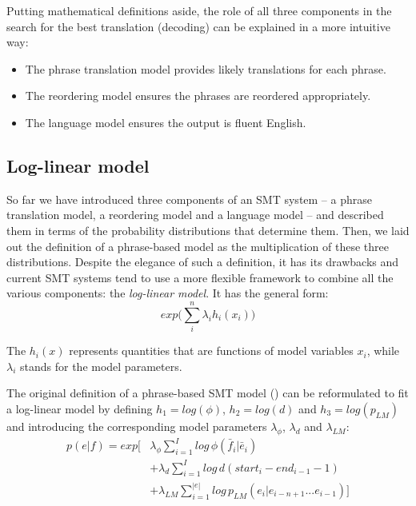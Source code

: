 Putting mathematical definitions aside, the role of all three components in the search for
the best translation (decoding) can be explained in a more intuitive way:
\begin{itemize}
  \item The phrase translation model provides likely translations for each phrase.
  \item The reordering model ensures the phrases are reordered appropriately.
  \item The language model ensures the output is fluent English.
\end{itemize}

\subsection{Log-linear model}

So far we have introduced three components of an SMT system -- a phrase translation model,
a reordering model and a language model -- and described them in terms of the probability
distributions that determine them.
Then, we laid out the definition of a phrase-based model as the multiplication of these
three distributions.
Despite the elegance of such a definition, it has its drawbacks and current SMT
systems tend to use a more flexible framework to combine all the various
components: the \emph{log-linear model}.
It has the general form:
\begin{equation}
  exp \Big( \sum_i^n \lambda_i h_i(x_i) \Big)
\end{equation}

The $h_i(x)$ represents quantities that are functions of model variables $x_i$,
while $\lambda_i$ stands for the model parameters.

The original definition of a phrase-based SMT model () can be reformulated to
fit a log-linear model by defining $h_1 = log(\phi)$, $h_2 = log(d)$ and $h_3 = log(p_{LM})$
and introducing the corresponding model parameters $\lambda_{\phi}$, $\lambda_{d}$ and $\lambda_{LM}$:
\begin{equation}
  \begin{aligned}
  p(e|f) = exp \Bigg[ &\lambda_{\phi} \sum_{i=1}^I log \, \phi(\bar{f}_i|\bar{e}_i) \\
       &+ \lambda_{d} \sum_{i=1}^{I} log \, d(start_i - end_{i-1} - 1) \\
       &+ \lambda_{LM} \sum_{i=1}^{|e|} log \, p_{LM}(e_i|e_{i-n+1}...e_{i-1}) \Bigg] \\
  \end{aligned}
\end{equation}

